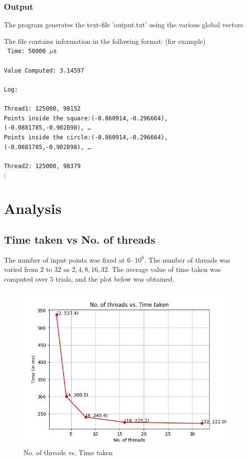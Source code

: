 \documentclass[12pt]{article}
\begin{document}
\subsubsection{Output}
The program generates the text-file 'output.txt' using the various global vectors

The file contains information in the following format: (for example) \\

\texttt{
\noindent Time: 50000 $\mu$s \\ \\
Value Computed: 3.14597 \\ \\
Log: \\ \\
Thread1: 125000, 98152\\
Points inside the square:(-0.860914,-0.296664), (-0.0881785,-0.902898), \dots \\
Points inside the circle:(-0.860914,-0.296664), (-0.0881785,-0.902898),  \dots \\ \\
Thread2: 125000, 98379\\
$\vdots$ \\
}
\section{Analysis}

\subsection{Time taken vs No. of threads}
The number of input points was fixed at $6 \cdot 10^6$. The number of threads was varied from $2$ to $32$ as $2, 4, 8, 16, 32$. The average value of time taken 
was computed over $5$ trials, and the plot below was obtained.


\begin{figure}[H]
  \centering
  \includegraphics[width=\columnwidth]{Figure_1.png}
  \caption{No. of threads vs. Time taken}
  \label{fig-1}
  \end{figure}
\end{document}
